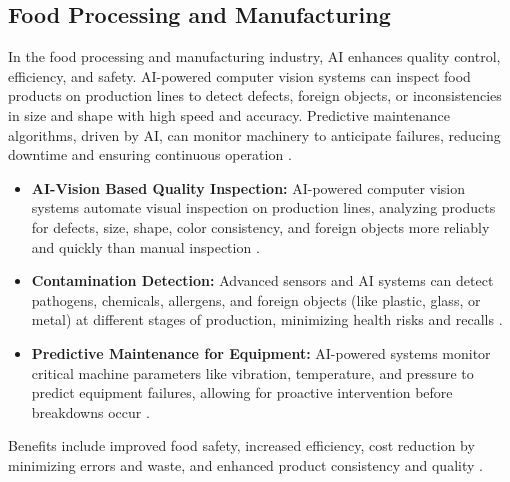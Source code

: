 \subsection{Food Processing and Manufacturing}
In the food processing and manufacturing industry, AI enhances quality control, efficiency, and safety. AI-powered computer vision systems can inspect food products on production lines to detect defects, foreign objects, or inconsistencies in size and shape with high speed and accuracy. Predictive maintenance algorithms, driven by AI, can monitor machinery to anticipate failures, reducing downtime and ensuring continuous operation \cite{subedi2023ai}.
\begin{itemize}
    \item \textbf{AI-Vision Based Quality Inspection:} AI-powered computer vision systems automate visual inspection on production lines, analyzing products for defects, size, shape, color consistency, and foreign objects more reliably and quickly than manual inspection \cite{ThomasNet_FoodProcessing, FoodManufacturing_FoodProcessing}.
    \item \textbf{Contamination Detection:} Advanced sensors and AI systems can detect pathogens, chemicals, allergens, and foreign objects (like plastic, glass, or metal) at different stages of production, minimizing health risks and recalls \cite{Folio3_FoodProcessing, EasyODM_FoodProcessing}.
    \item \textbf{Predictive Maintenance for Equipment:} AI-powered systems monitor critical machine parameters like vibration, temperature, and pressure to predict equipment failures, allowing for proactive intervention before breakdowns occur \cite{Arshon_FoodProcessing, Updata_FoodProcessing}.
\end{itemize}
Benefits include improved food safety, increased efficiency, cost reduction by minimizing errors and waste, and enhanced product consistency and quality \cite{SilkFlo_FoodProcessing, AIOLA_FoodProcessing}.

